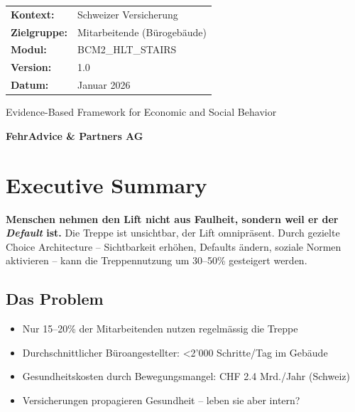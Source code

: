 \documentclass[11pt,a4paper]{article}
\begin{document}
\begin{titlepage}
\begin{center}
\begin{tabular}{ll}
\textbf{Kontext:} & Schweizer Versicherung \\
\textbf{Zielgruppe:} & Mitarbeitende (Bürogebäude) \\
\textbf{Modul:} & BCM2\_HLT\_STAIRS \\
\textbf{Version:} & 1.0 \\
\textbf{Datum:} & Januar 2026 \\
\end{tabular}

\vfill

{\small\color{fadarkgray}Evidence-Based Framework for Economic and Social Behavior\par}
\vspace{0.3cm}
{\color{fadarkblue}\textbf{FehrAdvice \& Partners AG}\par}

\end{center}
\end{titlepage}


\section*{\color{fadarkblue}Executive Summary}

\begin{tcolorbox}[fainfobox={Kernbotschaft}]
\textbf{Menschen nehmen den Lift nicht aus Faulheit, sondern weil er der \textit{Default} ist.} Die Treppe ist unsichtbar, der Lift omnipräsent. Durch gezielte Choice Architecture -- Sichtbarkeit erhöhen, Defaults ändern, soziale Normen aktivieren -- kann die Treppennutzung um 30--50\% gesteigert werden.
\end{tcolorbox}

\subsection*{Das Problem}
\begin{itemize}
    \item Nur 15--20\% der Mitarbeitenden nutzen regelmässig die Treppe
    \item Durchschnittlicher Büroangestellter: <2'000 Schritte/Tag im Gebäude
    \item Gesundheitskosten durch Bewegungsmangel: CHF 2.4 Mrd./Jahr (Schweiz)
    \item Versicherungen propagieren Gesundheit -- leben sie aber intern?
\end{itemize}
\end{document}
